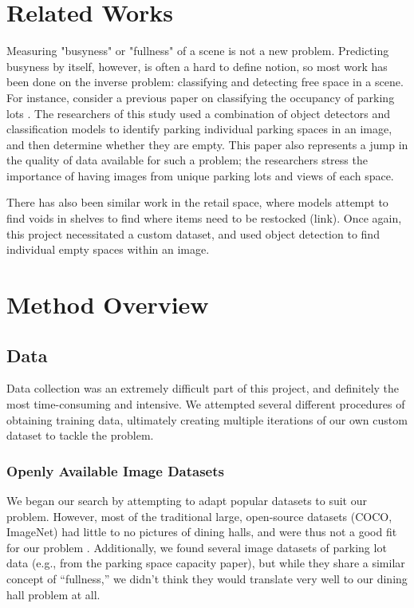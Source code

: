 \documentclass{article}
\begin{document}
\begin{multicols}{2}
\section{Related Works}
Measuring "busyness" or "fullness" of a scene is not a new problem. Predicting busyness by itself, however, is often a hard to define notion, so most work has been done on the inverse problem: classifying and detecting free space in a scene. For instance, consider a previous paper on classifying the occupancy of parking lots \cite{marekImageBasedParkingSpace2021}. The researchers of this study used a combination of object detectors and classification models to identify parking individual parking spaces in an image, and then determine whether they are empty. This paper also represents a jump in the quality of data available for such a problem; the researchers stress the importance of having images from unique parking lots and views of each space.

There has also been similar work in the retail space, where models attempt to find voids in shelves to find where items need to be restocked (link). Once again, this project necessitated a custom dataset, and used object detection to find individual empty spaces within an image.

\section{Method Overview}
\subsection*{Data}
Data collection was an extremely difficult part of this project, and definitely the most time-consuming and intensive. We attempted several different procedures of obtaining training data, ultimately creating multiple iterations of our own custom dataset to tackle the problem.

\subsubsection*{Openly Available Image Datasets}
We began our search by attempting to adapt popular datasets to suit our problem. However, most of the traditional large, open-source datasets (COCO, ImageNet) had little to no pictures of dining halls, and were thus not a good fit for our problem \cite{linMicrosoftCOCOCommon2015,russakovskyImageNetLargeScale2015}. Additionally, we found several image datasets of parking lot data (e.g., from the parking space capacity paper), but while they share a similar concept of “fullness,” we didn’t think they would translate very well to our dining hall problem at all.


\end{multicols}
\end{document}
